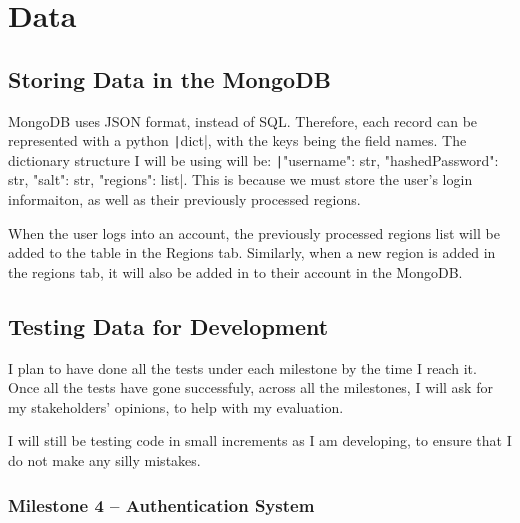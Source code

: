 \documentclass[12pt]{report}
\newcommand{\pil}[1]{\protect\texttt|#1|}
\begin{document}
\section{Data}
\subsection{Storing Data in the MongoDB}
MongoDB uses JSON format, instead of SQL. Therefore, each record can be represented with a python \pil{dict}, with the keys being the field names. The dictionary structure I will be using will be: \texttt|{"username": str, "hashedPassword": str, "salt": str, "regions": list}|. This is because we must store the user's login informaiton, as well as their previously processed regions.

When the user logs into an account, the previously processed regions list will be added to the table in the Regions tab. Similarly, when a new region is added in the regions tab, it will also be added in to their account in the MongoDB.

\subsection{Testing Data for Development}
I plan to have done all the tests under each milestone by the time I reach it. Once all the tests have gone successfuly, across all the milestones, I will ask for my stakeholders' opinions, to help with my evaluation.

I will still be testing code in small increments as I am developing, to ensure that I do not make any silly mistakes.
\subsubsection{Milestone 4 -- Authentication System}
\begin{center}
\end{center}
\end{document}
